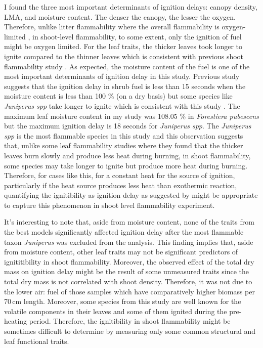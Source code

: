 \documentclass[12pt]{report}
\begin{document}
I found the three most important determinants of ignition delays: canopy density, LMA, and moisture content. The denser the canopy, the lesser the oxygen. Therefore, unlike litter flammability where the overall flammability is oxygen-limited \citep{schwilk2015dimensions}, in shoot-level flammability, to some extent, only the ignition of fuel might be oxygen limited. For the leaf traits, the thicker leaves took longer to ignite compared to the thinner leaves which is consistent with previous shoot flammability study \citep{alam2020shoot}. As expected, the moisture content of the fuel is one of the most important determinants of ignition delay in this study. Previous study suggests that the ignition delay in shrub fuel is less than 15 seconds when the moisture content is less than 100 \% (on a dry basis) but some species like \emph{Juniperus spp} take longer to ignite which is consistent with this study \citep{dimitrakopoulos2001flammability,pellizzaro2007seasonal}. The maximum leaf moisture content in my study was 108.05 \% in \emph{Forestiera pubescens} but the maximum ignition delay is 18 seconds for \emph{Juniperus spp}. The \emph{Juniperus spp} is the most flammable species in this study and this observation suggests that, unlike some leaf flammability studies where they found that the thicker leaves burn slowly and produce less heat during burning, in shoot flammability, some species may take longer to ignite but produce more heat during burning. Therefore, for cases like this, for a constant heat for the source of ignition, particularly if the heat source produces less heat than exothermic reaction, quantifying the ignitibility as ignition delay as suggested by \citep{anderson1970forest} might be appropriate to capture this phenomenon in shoot level flammability experiment.

It's interesting to note that, aside from moisture content, none of the traits from the best models significantly affected ignition delay after the most flammable taxon \emph{Juniperus} was excluded from the analysis. This finding implies that, aside from moisture content, other leaf traits may not be significant predictors of ignititibility in shoot flammability. Moreover, the observed effect of the total dry mass on ignition delay might be the result of some unmeasured traits since the total dry mass is not correlated with shoot density. Therefore, it was not due to the lower air: fuel of those samples which have comparatively higher biomass per 70\,cm length. Moreover, some species from this study are well known for the volatile components in their leaves and some of them  ignited during the pre-heating period. Therefore, the ignitibility in shoot flammability might be sometimes difficult to determine by measuring only some common structural and leaf functional traits.
\end{document}
